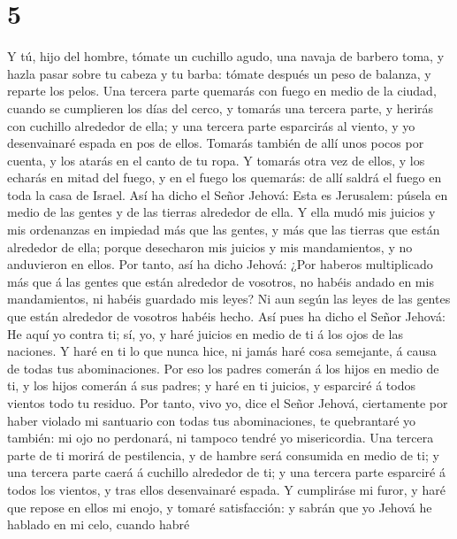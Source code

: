 \hypertarget{section-4}{%
\section{5}\label{section-4}}

 Y tú, hijo del hombre, tómate un cuchillo agudo, una navaja
de barbero toma, y hazla pasar sobre tu cabeza y tu barba: tómate
después un peso de balanza, y reparte los pelos.  Una
tercera parte quemarás con fuego en medio de la ciudad, cuando se
cumplieren los días del cerco, y tomarás una tercera parte, y herirás
con cuchillo alrededor de ella; y una tercera parte esparcirás al
viento, y yo desenvainaré espada en pos de ellos.  Tomarás
también de allí unos pocos por cuenta, y los atarás en el canto de tu
ropa.  Y tomarás otra vez de ellos, y los echarás en mitad
del fuego, y en el fuego los quemarás: de allí saldrá el fuego en toda
la casa de Israel.  Así ha dicho el Señor Jehová: Esta es
Jerusalem: púsela en medio de las gentes y de las tierras alrededor de
ella.  Y ella mudó mis juicios y mis ordenanzas en impiedad
más que las gentes, y más que las tierras que están alrededor de ella;
porque desecharon mis juicios y mis mandamientos, y no anduvieron en
ellos.  Por tanto, así ha dicho Jehová: ¿Por haberos
multiplicado más que á las gentes que están alrededor de vosotros, no
habéis andado en mis mandamientos, ni habéis guardado mis leyes? Ni aun
según las leyes de las gentes que están alrededor de vosotros habéis
hecho.  Así pues ha dicho el Señor Jehová: He aquí yo contra
ti; sí, yo, y haré juicios en medio de ti á los ojos de las naciones.
 Y haré en ti lo que nunca hice, ni jamás haré cosa
semejante, á causa de todas tus abominaciones.  Por eso los
padres comerán á los hijos en medio de ti, y los hijos comerán á sus
padres; y haré en ti juicios, y esparciré á todos vientos todo tu
residuo.  Por tanto, vivo yo, dice el Señor Jehová,
ciertamente por haber violado mi santuario con todas tus abominaciones,
te quebrantaré yo también: mi ojo no perdonará, ni tampoco tendré yo
misericordia.  Una tercera parte de ti morirá de
pestilencia, y de hambre será consumida en medio de ti; y una tercera
parte caerá á cuchillo alrededor de ti; y una tercera parte esparciré á
todos los vientos, y tras ellos desenvainaré espada.  Y
cumpliráse mi furor, y haré que repose en ellos mi enojo, y tomaré
satisfacción: y sabrán que yo Jehová he hablado en mi celo, cuando habré
